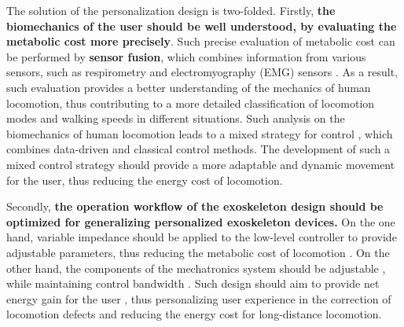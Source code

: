 \documentclass{article}
\begin{document}


The solution of the personalization design is two-folded. Firstly, \textbf{the biomechanics of the user should be well understood, by evaluating the metabolic cost more precisely}. Such precise evaluation of metabolic cost can be performed by \textbf{sensor fusion}, which combines information from various sensors, such as respirometry and electromyography (EMG) sensors \cite{PersonalizeMain}. As a result, such evaluation provides a better understanding of the mechanics of human locomotion, thus contributing to a more detailed classification of locomotion modes and walking speeds in different situations. Such analysis on the biomechanics of human locomotion leads to a mixed strategy for control \cite{DataDriven}, which combines data-driven and classical control methods. The development of such a mixed control strategy should provide a more adaptable and dynamic movement for the user, thus reducing the energy cost of locomotion.

Secondly, \textbf{the operation workflow of the exoskeleton design should be optimized for generalizing personalized exoskeleton devices.} On the one hand, variable impedance should be applied to the low-level controller to provide adjustable parameters, thus reducing the metabolic cost of locomotion \cite{PersonalizeMain}. On the other hand, the components of the mechatronics system should be adjustable \cite{OSLSpring} \cite{VariableMecheSys}, while maintaining control bandwidth \cite{SEABandwidth}. Such design should aim to provide net energy gain for the user \cite{OSL2020}, thus personalizing user experience in the correction of locomotion defects and reducing the energy cost for long-distance locomotion.
\end{document}
